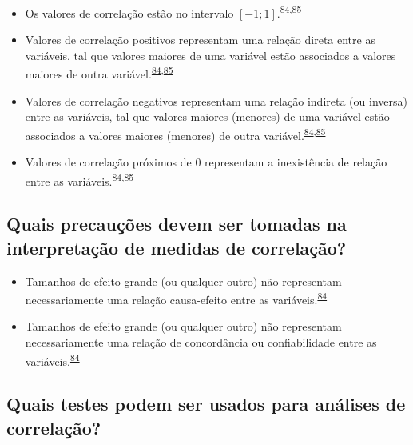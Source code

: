 \documentclass[
]{book}
\begin{document}
\begin{itemize}
\item
  Os valores de correlação estão no intervalo \([-1; 1]\).\textsuperscript{\protect\hyperlink{ref-khamis2008}{84},\protect\hyperlink{ref-allison2022}{85}}
\item
  Valores de correlação positivos representam uma relação direta entre as variáveis, tal que valores maiores de uma variável estão associados a valores maiores de outra variável.\textsuperscript{\protect\hyperlink{ref-khamis2008}{84},\protect\hyperlink{ref-allison2022}{85}}
\item
  Valores de correlação negativos representam uma relação indireta (ou inversa) entre as variáveis, tal que valores maiores (menores) de uma variável estão associados a valores maiores (menores) de outra variável.\textsuperscript{\protect\hyperlink{ref-khamis2008}{84},\protect\hyperlink{ref-allison2022}{85}}
\item
  Valores de correlação próximos de \(0\) representam a inexistência de relação entre as variáveis.\textsuperscript{\protect\hyperlink{ref-khamis2008}{84},\protect\hyperlink{ref-allison2022}{85}}
\end{itemize}

\hypertarget{quais-precauuxe7uxf5es-devem-ser-tomadas-na-interpretauxe7uxe3o-de-medidas-de-correlauxe7uxe3o}{%
\subsection{Quais precauções devem ser tomadas na interpretação de medidas de correlação?}\label{quais-precauuxe7uxf5es-devem-ser-tomadas-na-interpretauxe7uxe3o-de-medidas-de-correlauxe7uxe3o}}

\begin{itemize}
\item
  Tamanhos de efeito grande (ou qualquer outro) não representam necessariamente uma relação causa-efeito entre as variáveis.\textsuperscript{\protect\hyperlink{ref-khamis2008}{84}}
\item
  Tamanhos de efeito grande (ou qualquer outro) não representam necessariamente uma relação de concordância ou confiabilidade entre as variáveis.\textsuperscript{\protect\hyperlink{ref-khamis2008}{84}}
\end{itemize}

\hypertarget{quais-testes-podem-ser-usados-para-anuxe1lises-de-correlauxe7uxe3o}{%
\subsection{Quais testes podem ser usados para análises de correlação?}\label{quais-testes-podem-ser-usados-para-anuxe1lises-de-correlauxe7uxe3o}}
\end{document}
